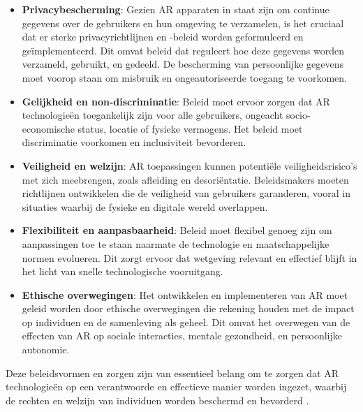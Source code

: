 \begin{itemize}
    \item \textbf{Privacybescherming}: Gezien AR apparaten in staat zijn om continue gegevens over de gebruikers en hun omgeving te verzamelen, is het cruciaal dat er sterke privacyrichtlijnen en -beleid worden geformuleerd en geïmplementeerd. Dit omvat beleid dat reguleert hoe deze gegevens worden verzameld, gebruikt, en gedeeld. De bescherming van persoonlijke gegevens moet voorop staan om misbruik en ongeautoriseerde toegang te voorkomen.
    \item \textbf{Gelijkheid en non-discriminatie}: Beleid moet ervoor zorgen dat AR technologieën toegankelijk zijn voor alle gebruikers, ongeacht socio-economische status, locatie of fysieke vermogens. Het beleid moet discriminatie voorkomen en inclusiviteit bevorderen.
    \item \textbf{Veiligheid en welzijn}: AR toepassingen kunnen potentiële veiligheidsrisico's met zich meebrengen, zoals afleiding en desoriëntatie. Beleidsmakers moeten richtlijnen ontwikkelen die de veiligheid van gebruikers garanderen, vooral in situaties waarbij de fysieke en digitale wereld overlappen.
    \item \textbf{Flexibiliteit en aanpasbaarheid}: Beleid moet flexibel genoeg zijn om aanpassingen toe te staan naarmate de technologie en maatschappelijke normen evolueren. Dit zorgt ervoor dat wetgeving relevant en effectief blijft in het licht van snelle technologische vooruitgang.
    \item \textbf{Ethische overwegingen}: Het ontwikkelen en implementeren van AR moet geleid worden door ethische overwegingen die rekening houden met de impact op individuen en de samenleving als geheel. Dit omvat het overwegen van de effecten van AR op sociale interacties, mentale gezondheid, en persoonlijke autonomie.
\end{itemize}

Deze beleidsvormen en zorgen zijn van essentieel belang om te zorgen dat AR technologieën op een verantwoorde en effectieve manier worden ingezet, waarbij de rechten en welzijn van individuen worden beschermd en bevorderd \autocite{Roesner2014}.




